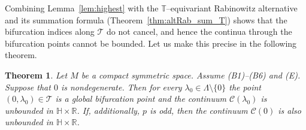 \documentclass[reqno,twoside,12pt]{amsart}
\newtheorem{Theorem}[Remark]{Theorem}
\newcommand{\bH}{\mathbb{H}}
\newcommand{\bT}{\mathbb{T}}
\newcommand{\cT}{\mathcal{T}}
\numberwithin{equation}{section} \errorcontextlines=0
\begin{document}
Combining Lemma~\ref{lem:highest} with the $\bT$–equivariant Rabinowitz alternative and its summation formula (Theorem~\ref{thm:altRab_sum_T}) shows that the bifurcation indices along $\cT$ do not cancel, and hence the continua through the bifurcation points cannot be bounded. Let us make this precise in the following theorem.

\begin{Theorem}\label{thm:unbounded}
Let $M$ be a compact symmetric space. Assume \textnormal{(B1)}--\textnormal{(B6)} and \textnormal{(E)}. Suppose that $0$ is nondegenerate. Then for every $\lambda_{0}\in\Lambda\setminus\{0\}$ the point $(0,\lambda_{0})\in\cT$ is a global bifurcation point and the continuum $\mathcal{C}(\lambda_0)$ is unbounded in $\bH\times\mathbb{R}$. If, additionally, $p$ is odd, then the continuum $\mathcal{C}(0)$ is also unbounded in $\bH\times\mathbb{R}$.
\end{Theorem}
\end{document}
